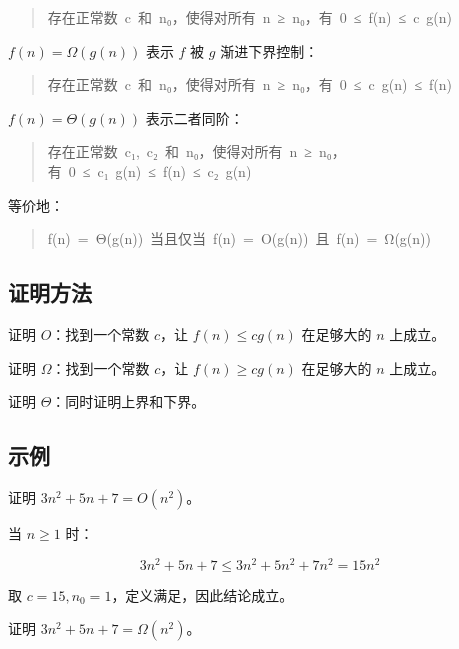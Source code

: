 \documentclass[UTF8,zihao=-4]{ctexart}
\begin{document}
\begin{quote}
\small\ttfamily\raggedright
\relax 存在正常数\ c\ 和\ n₀，使得对所有\ n\ ≥\ n₀，有\ 0\ ≤\ f(n)\ ≤\ c\ g(n)\\
\end{quote}

$f(n) = \Omega(g(n))$ 表示 $f$ 被 $g$ 渐进下界控制：

\begin{quote}
\small\ttfamily\raggedright
\relax 存在正常数\ c\ 和\ n₀，使得对所有\ n\ ≥\ n₀，有\ 0\ ≤\ c\ g(n)\ ≤\ f(n)\\
\end{quote}

$f(n) = \Theta(g(n))$ 表示二者同阶：

\begin{quote}
\small\ttfamily\raggedright
\relax 存在正常数\ c₁,\ c₂\ 和\ n₀，使得对所有\ n\ ≥\ n₀，有\ 0\ ≤\ c₁\ g(n)\ ≤\ f(n)\ ≤\ c₂\ g(n)\\
\end{quote}

等价地：

\begin{quote}
\small\ttfamily\raggedright
\relax f(n)\ =\ Θ(g(n))\ 当且仅当\ f(n)\ =\ O(g(n))\ 且\ f(n)\ =\ Ω(g(n))\\
\end{quote}

\subsection*{证明方法}

证明 $O$：找到一个常数 $c$，让 $f(n) \le c g(n)$ 在足够大的 $n$ 上成立。

证明 $\Omega$：找到一个常数 $c$，让 $f(n) \ge c g(n)$ 在足够大的 $n$ 上成立。

证明 $\Theta$：同时证明上界和下界。

\subsection*{示例}

证明 $3n^2 + 5n + 7 = O(n^2)$。

当 $n \ge 1$ 时：

\[3n^{2} + 5n + 7 \le  3n^{2} + 5n^{2} + 7n^{2} = 15n^{2}\]

取 $c = 15, n_0 = 1$，定义满足，因此结论成立。

证明 $3n^2 + 5n + 7 = \Omega(n^2)$。
\end{document}
